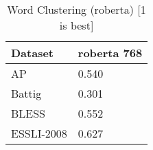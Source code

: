 \begin{table}[]
\centering
\begin{tabular}{l|l}
\hline
Dataset & roberta 768 \\
\hline
AP & 0.540 \\ 
Battig & 0.301 \\ 
BLESS & 0.552 \\ 
ESSLI-2008 & 0.627
\end{tabular}
\caption{Word Clustering (roberta) [1 is best]}
\label{tab:cluster-roberta}
\end{table}
